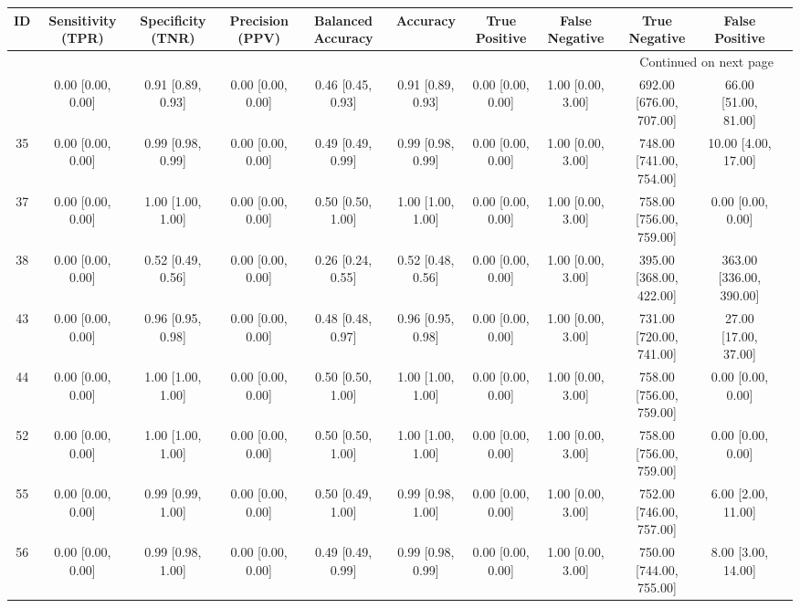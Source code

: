 \documentclass[8pt]{article}
\begin{document}
\begin{center}
\begin{footnotesize}
\begin{longtable}{|ccccccccccc|}
\toprule
 ID &  Sensitivity (TPR) &  Specificity (TNR) &    Precision (PPV) &  Balanced Accuracy &           Accuracy &      True Positive &     False Negative &            True Negative &           False Positive \\
\midrule
\endhead
\midrule
\multicolumn{10}{r}{{Continued on next page}} \\
\midrule
\endfoot

\bottomrule
\endlastfoot
 33 &  0.00 [0.00, 0.00] &  0.91 [0.89, 0.93] &  0.00 [0.00, 0.00] &  0.46 [0.45, 0.93] &  0.91 [0.89, 0.93] &  0.00 [0.00, 0.00] &  1.00 [0.00, 3.00] &  692.00 [676.00, 707.00] &     66.00 [51.00, 81.00] \\
 35 &  0.00 [0.00, 0.00] &  0.99 [0.98, 0.99] &  0.00 [0.00, 0.00] &  0.49 [0.49, 0.99] &  0.99 [0.98, 0.99] &  0.00 [0.00, 0.00] &  1.00 [0.00, 3.00] &  748.00 [741.00, 754.00] &      10.00 [4.00, 17.00] \\
 37 &  0.00 [0.00, 0.00] &  1.00 [1.00, 1.00] &  0.00 [0.00, 0.00] &  0.50 [0.50, 1.00] &  1.00 [1.00, 1.00] &  0.00 [0.00, 0.00] &  1.00 [0.00, 3.00] &  758.00 [756.00, 759.00] &        0.00 [0.00, 0.00] \\
 38 &  0.00 [0.00, 0.00] &  0.52 [0.49, 0.56] &  0.00 [0.00, 0.00] &  0.26 [0.24, 0.55] &  0.52 [0.48, 0.56] &  0.00 [0.00, 0.00] &  1.00 [0.00, 3.00] &  395.00 [368.00, 422.00] &  363.00 [336.00, 390.00] \\
 43 &  0.00 [0.00, 0.00] &  0.96 [0.95, 0.98] &  0.00 [0.00, 0.00] &  0.48 [0.48, 0.97] &  0.96 [0.95, 0.98] &  0.00 [0.00, 0.00] &  1.00 [0.00, 3.00] &  731.00 [720.00, 741.00] &     27.00 [17.00, 37.00] \\
 44 &  0.00 [0.00, 0.00] &  1.00 [1.00, 1.00] &  0.00 [0.00, 0.00] &  0.50 [0.50, 1.00] &  1.00 [1.00, 1.00] &  0.00 [0.00, 0.00] &  1.00 [0.00, 3.00] &  758.00 [756.00, 759.00] &        0.00 [0.00, 0.00] \\
 52 &  0.00 [0.00, 0.00] &  1.00 [1.00, 1.00] &  0.00 [0.00, 0.00] &  0.50 [0.50, 1.00] &  1.00 [1.00, 1.00] &  0.00 [0.00, 0.00] &  1.00 [0.00, 3.00] &  758.00 [756.00, 759.00] &        0.00 [0.00, 0.00] \\
 55 &  0.00 [0.00, 0.00] &  0.99 [0.99, 1.00] &  0.00 [0.00, 0.00] &  0.50 [0.49, 1.00] &  0.99 [0.98, 1.00] &  0.00 [0.00, 0.00] &  1.00 [0.00, 3.00] &  752.00 [746.00, 757.00] &       6.00 [2.00, 11.00] \\
 56 &  0.00 [0.00, 0.00] &  0.99 [0.98, 1.00] &  0.00 [0.00, 0.00] &  0.49 [0.49, 0.99] &  0.99 [0.98, 0.99] &  0.00 [0.00, 0.00] &  1.00 [0.00, 3.00] &  750.00 [744.00, 755.00] &       8.00 [3.00, 14.00] \\
\end{longtable}
\end{footnotesize}
\end{center}
\end{document}
